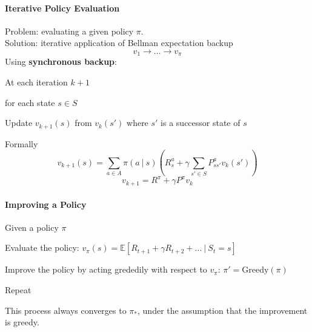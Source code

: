 \documentclass[10pt]{report}
\begin{document}
\paragraph{Iterative Policy Evaluation} Problem: evaluating a given policy $\pi$.\\
Solution: iterative application of Bellman expectation backup
$$v_1\rightarrow \ldots \rightarrow v_\pi$$
Using \textbf{synchronous backup}:
\begin{list}{}{}
	\item At each iteration $k+1$
	\item for each state $s\in S$
	\item Update $v_{k+1}(s)$ from $v_k(s')$ where $s'$ is a successor state of $s$
\end{list}
Formally
$$v_{k+1}(s) = \sum_{a\in A} \pi(a\:|\:s)\left(R_s^a+\gamma\sum_{s'\in S}P_{ss'}^av_k(s')\right)$$
$$v_{k+1} = R^\pi +\gamma P^\pi v_k$$
\paragraph{Improving a Policy} Given a policy $\pi$\begin{list}{}{}
	\item Evaluate the policy: $v_\pi(s) = \mathbb{E}[R_{t+1} + \gamma R_{t+2} + \ldots\:|\:S_t =s]$
	\item Improve the policy by acting grededily with respect to $v_\pi$:
	$\pi' = \text{Greedy}(\pi)$
	\item Repeat
\end{list}
This process always converges to $\pi_*$, under the assumption that the improvement is greedy.
\end{document}
